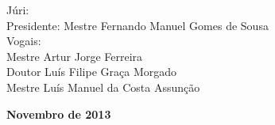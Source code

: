 \begin{titlepage}
\begin{center}
\begin{tabbing}
		   \fontsize{12pt}{10pt}\selectfont
		   Júri: \\
		   \fontsize{11pt}{10pt}\selectfont
		   \hspace{1.1cm}Presidente: Mestre Fernando Manuel Gomes de Sousa \\
		   \fontsize{11pt}{10pt}\selectfont
		   \hspace{1.1cm}Vogais: \\
		   \fontsize{11pt}{10pt}\selectfont
		   \hspace{2.2cm}Mestre Artur Jorge Ferreira \\
		   \fontsize{11pt}{10pt}\selectfont
		   \hspace{2.2cm}Doutor Luís Filipe Graça Morgado\\
		   \fontsize{11pt}{10pt}\selectfont
		   \hspace{2.2cm}Mestre Luís Manuel da Costa Assunção\\
		\end{tabbing}
		
		\fontsize{10pt}{10pt}\selectfont
		\textbf{Novembro de 2013}
	\end{center}
	
	\newpage
	\thispagestyle{empty}
	\cleardoublepage
	\newpage
	\thispagestyle{empty}
	

\end{titlepage}
